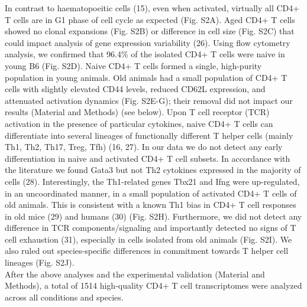 In contrast to haematopoeitic cells (15), even when activated, virtually all CD4+ T cells are in G1 phase of cell cycle as expected (Fig. S2A). Aged CD4+ T cells showed no clonal expansions (Fig. S2B) or difference in cell size (Fig. S2C) that could impact analysis of gene expression variability (26). Using flow cytometry analysis, we confirmed that 96.4\% of the isolated CD4+ T cells were naive in young B6 (Fig. S2D). Naive CD4+ T cells formed a single, high-purity population in young animals. Old animals had a small population of CD4+ T cells with slightly elevated CD44 levels, reduced CD62L expression, and attenuated activation dynamics (Fig. S2E-G); their removal did not impact our results (Material and Methods) (see below). Upon T cell receptor (TCR) activation in the presence of particular cytokines, naive CD4+ T cells can differentiate into several lineages of functionally different T helper cells (mainly Th1, Th2, Th17, Treg, Tfh) (16, 27). In our data we do not detect any early differentiation in naive and activated CD4+ T cell subsets. In accordance with the literature we found Gata3 but not Th2 cytokines expressed in the majority of cells  (28). Interestingly, the Th1-related genes Tbx21 and Ifng were up-regulated, in an uncoordinated manner, in a small population of activated CD4+ T cells of old animals. This is consistent with a known Th1 bias in CD4+ T cell responses in old mice (29) and humans (30) (Fig. S2H). Furthermore, we did not detect any difference in TCR components/signaling and importantly detected no signs of T cell exhaustion (31), especially in cells isolated from old animals (Fig. S2I). We also ruled out species-specific differences in commitment towards T helper cell lineages (Fig. S2J). \\

After the above analyses and the experimental validation (Material and Methods), a total of 1514 high-quality CD4+ T cell transcriptomes were analyzed across all conditions and species.

